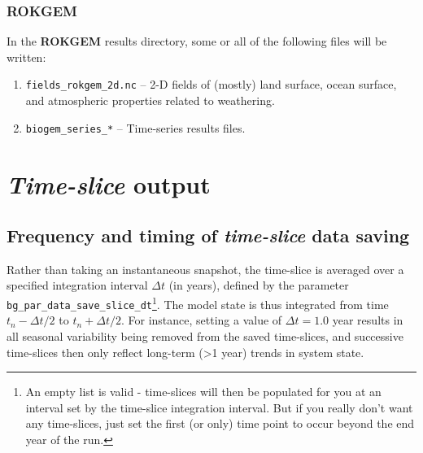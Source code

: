 \documentclass[11pt,fleqn]{book} %
\begin{document}
\subsubsection{ROKGEM}

\noindent In the \textbf{ROKGEM} results directory, some or all of the following files will be written:

\begin{enumerate}

\vspace{1mm}\item \texttt{fields\_rokgem\_2d.nc} -- 2-D fields of (mostly) land surface, ocean surface, and atmospheric properties related to weathering.

\vspace{1mm}\item \texttt{biogem\_series\_*} -- Time-series results files.
        
\end{enumerate}\vspace{2mm}


\newpage


\section{\textit{Time-slice} output}


\subsection{Frequency and timing of \textit{time-slice} data saving}

Rather than taking an instantaneous snapshot, the time-slice is averaged over a specified integration interval \begin{math}\Delta t\end{math} (in years), defined by the parameter \texttt{bg\_par\_data\_save\_slice\_dt}\footnote{An empty list is valid - time-slices will then be populated for you at an interval set by the time-slice integration interval. But if you really don't want any time-slices, just set the first (or only) time point to occur beyond the end year of the run.}. The model state is thus integrated from time \begin{math}t_{n} - \Delta t/2\end{math} to \begin{math}t_{n} + \Delta t/2\end{math}. For instance, setting a value of \begin{math}\Delta t = 1.0\end{math} year results in all seasonal variability being removed from the saved time-slices, and successive time-slices then only reflect long-term (\textgreater 1 year) trends in system state.
\end{document}
